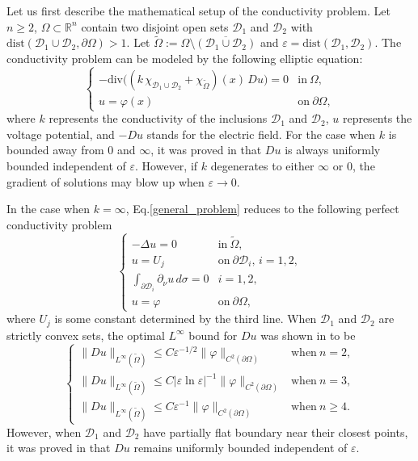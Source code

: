 \documentclass[reqno, 10pt]{amsart}
\theoremstyle{plain}
\theoremstyle{definition}
\theoremstyle{remark}
\numberwithin{equation}{section}
\newcommand{\bR}{\mathbb{R}}
\newcommand\cD{\mathcal{D}}
\begin{document}
Let us first describe the mathematical setup of the conductivity problem. Let $n\ge 2$, $\Omega\subset \bR^n$ contain two disjoint open sets $\cD_1$ and $\cD_2$ with $\text{dist}(\cD_1\cup \cD_2, \partial\Omega)>1$. Let $\widetilde{\Omega} := \Omega \setminus \overline{(\cD_1 \cup \cD_2)}$ and $\varepsilon=\text{dist}(\cD_1, \cD_2)$. The conductivity problem can be modeled by the following elliptic equation:
\begin{equation}\label{general_problem}
\begin{cases}
-\mathrm{div}\Big((k \,\chi_{\cD_1\cup \cD_2}+ \chi_{\widetilde{\Omega}})(x)\,D{u}\Big)=0&\mbox{in}~\Omega,\\
u=\varphi(x)&\mbox{on}~\partial\Omega,
\end{cases}
\end{equation}
where $k$ represents the conductivity of the inclusions $\cD_1$ and $\cD_2$, $u$ represents the voltage potential, and $-D u$ stands for the electric field. For the case when $k$ is bounded away from $0$ and $\infty$, it was proved in \cites{BV,LV,LN} that $Du$ is always uniformly bounded independent of $\varepsilon$. However, if $k$ degenerates to either $\infty$ or $0$, the gradient of solutions may blow up when $\varepsilon\to 0$.

In the case when $k=\infty$, Eq.\eqref{general_problem} reduces to the following perfect conductivity problem 
\begin{equation*}%
\begin{cases}
-\Delta u =0&\mbox{in}~\widetilde\Omega,\\
u  = U_j &\mbox{on}~\partial \cD_i,\, i = 1,2,\\
\int_{\partial \cD_i} \partial_\nu u \, d\sigma = 0& i=1,2,\\
u=\varphi&\mbox{on}~\partial\Omega,
\end{cases}
\end{equation*}
where $U_j$ is some constant determined by the third line.
When $\cD_1$ and $\cD_2$ are strictly convex sets, the optimal $L^\infty$ bound for $Du$ was shown in \cites{AKLLL,AKL,Y1,Y2,BLY1,BLY2} to be
\begin{equation*}
\begin{cases}
\| D u \|_{L^\infty(\widetilde{\Omega})} \le C\varepsilon^{-1/2} \|\varphi\|_{C^2(\partial \Omega)} &\mbox{when}~n=2,\\
\| D u \|_{L^\infty(\widetilde{\Omega})} \le C|\varepsilon \ln \varepsilon|^{-1} \|\varphi\|_{C^2(\partial \Omega)} &\mbox{when}~n=3,\\
\| D u \|_{L^\infty(\widetilde{\Omega})} \le C\varepsilon^{-1} \|\varphi\|_{C^2(\partial \Omega)} &\mbox{when}~n\ge 4.
\end{cases}
\end{equation*}
However, when
$\cD_1$ and $\cD_2$ have partially flat boundary near their closest points, it was proved in \cite{CLX} that $Du$ remains uniformly bounded independent of $\varepsilon$.  
\end{document}

